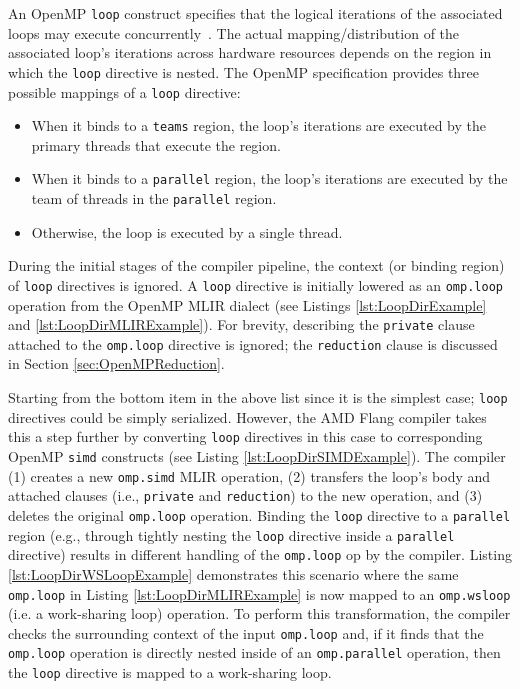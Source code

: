 \documentclass[acmtog,natbib=false]{acmart}
\newcommand{\code}[1]{\texttt{#1}\xspace}
\begin{document}
An OpenMP \code{loop} construct specifies that the logical iterations of the associated loops may execute concurrently~\cite{OARB21}.
The actual mapping/distribution of the associated loop's iterations across hardware resources depends on the region in which the \code{loop} directive is nested.
The OpenMP specification provides three possible mappings of a \code{loop} directive:
\begin{itemize}
    \item When it binds to a \code{teams} region, the loop's iterations are executed by the primary threads that execute the region.
    \item When it binds to a \code{parallel} region, the loop's iterations are executed by the team of threads in the \code{parallel} region.
    \item Otherwise, the loop is executed by a single thread.
\end{itemize}
During the initial stages of the compiler pipeline, the context (or binding region) of \code{loop} directives is ignored.
A \code{loop} directive is initially lowered as an \code{omp.loop} operation from the OpenMP \ac{MLIR} dialect (see Listings \ref{lst:LoopDirExample} and \ref{lst:LoopDirMLIRExample}).
For brevity, describing the \code{private} clause attached to the \code{omp.loop} directive is ignored; the \code{reduction} clause is discussed in Section \ref{sec:OpenMPReduction}.

Starting from the bottom item in the above list since it is the simplest case; \code{loop} directives could be simply serialized.
However, the AMD Flang compiler takes this a step further by converting \code{loop} directives in this case to corresponding OpenMP \code{simd} constructs (see Listing \ref{lst:LoopDirSIMDExample}).
The compiler (1) creates a new \code{omp.simd} \ac{MLIR} operation, (2) transfers the loop's body and attached clauses (i.e., \code{private} and \code{reduction}) to the new operation, and (3) deletes the original \code{omp.loop} operation.
Binding the \code{loop} directive to a \code{parallel} region (e.g., through tightly nesting the \code{loop} directive inside a \code{parallel} directive) results in different handling of the \code{omp.loop} op by the compiler.
Listing \ref{lst:LoopDirWSLoopExample} demonstrates this scenario where the same \code{omp.loop} in Listing \ref{lst:LoopDirMLIRExample} is now mapped to an \code{omp.wsloop} (i.e. a work-sharing loop) operation.
To perform this transformation, the compiler checks the surrounding context of the input \code{omp.loop} and, if it finds that the \code{omp.loop} operation is directly nested inside of an \code{omp.parallel} operation, then the \code{loop} directive is mapped to a work-sharing loop.
\end{document}
